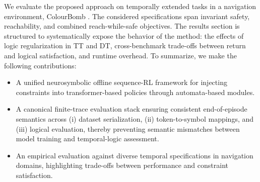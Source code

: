 We evaluate the proposed approach on temporally extended tasks in a navigation environment, ColourBomb \cite{prob_shielding_AAAI25}. The considered specifications span invariant safety, reachability, and combined reach-while-safe objectives. The results section is structured to systematically expose the behavior of the method: the effects of logic regularization in TT and DT, cross-benchmark trade-offs between return and logical satisfaction, and runtime overhead.
To summarize, we make the following contributions:
\begin{itemize}
    \item A unified neurosymbolic offline sequence-RL framework for injecting \ltlf constraints into transformer-based policies through automata-based modules.
    
    \item A canonical finite-trace evaluation stack ensuring consistent end-of-episode semantics across (i) dataset serialization, (ii) token-to-symbol mappings, and (iii) logical evaluation, thereby preventing semantic mismatches between model training and temporal-logic assessment.
    
    \item An empirical evaluation against diverse temporal specifications in navigation domains, highlighting trade-offs between performance and constraint satisfaction.
\end{itemize}
